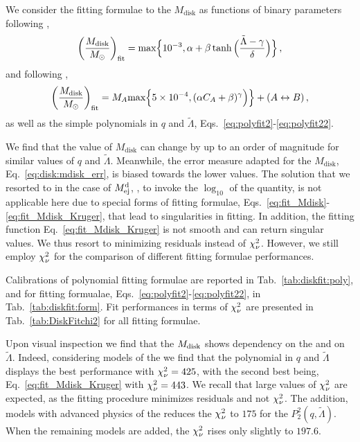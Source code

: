  

We consider the fitting formulae to the $M_{\text{disk}}$ as functions of binary parameters 
following \citet{Radice:2018pdn}, 
%
\begin{equation}
\left(\frac{M_{\rm{disk}}}{M_{\odot}}\right)_{\rm fit} = \text{max}\Big\{10^{-3}, \alpha + \beta \tanh\Big(\frac{\tilde{\Lambda}-\gamma}{\delta}\Big)\Big\}\,,
\label{eq:fit_Mdisk}
\end{equation}
%
and following \citet{Kruger:2020gig}, 
%
\begin{equation}
\left(\frac{M_{\rm{disk}}}{M_{\odot}}\right)_{\rm fit} =
M_A\text{max}\Big\{5\times 10^{-4}, (\alpha C_A + \beta)^\gamma
\Big)\Big\}
+ (A\leftrightarrow B)\, ,
\label{eq:fit_Mdisk_Kruger}
\end{equation}
%
as well as the simple polynomials in $q$ and $\tilde{\Lambda}$, 
Eqs.~\eqref{eq:polyfit2}-\eqref{eq:polyfit22}.


We find that the value of $M_{\text{disk}}$ can change by up to an order of magnitude 
for similar values of $q$ and $\tilde{\Lambda}$. Meanwhile, the error measure adapted for the 
$M_{\text{disk}}$, Eq.~\eqref{eq:disk:mdisk_err}, is biased towards the lower values. 
The solution that we resorted to in the case of $M^{\text{d}}_{\text{ej}}$, \ie, to invoke the $\log_{10}$ of the 
quantity, is not applicable here due to special forms of fitting formulae,  
Eqs.~\eqref{eq:fit_Mdisk}-\eqref{eq:fit_Mdisk_Kruger}, that lead to singularities in fitting.
%
In addition, the fitting function Eq.~\eqref{eq:fit_Mdisk_Kruger} 
is not smooth and can return singular values.
%
We thus resort to minimizing residuals instead of $\chi_{\nu}^2$. However, we still 
employ $\chi_{\nu}^2$ for the comparison of different fitting formulae performances. 

Calibrations of polynomial fitting formulae are reported in 
Tab.~\ref{tab:diskfit:poly}, and for fitting formualae, 
Eqs.~\eqref{eq:polyfit2}-\eqref{eq:polyfit22}, in Tab.~\ref{tab:diskfit:form}.
Fit performances in terms of $\chi_{\nu}^2$ are presented in Tab.~\ref{tab:DiskFitchi2} 
for all fitting formulae. 

Upon visual inspection we find that the $M_{\rm disk}$ shows 
dependency on the \mr{} 
and on $\tilde{\Lambda}$. Indeed, considering models of the \DSrefset{} 
we find 
that the polynomial in $q$ and $\tilde{\Lambda}$ displays the best performance with 
$\chi_{\nu}^2=425$, with the second best being, Eq.~\eqref{eq:fit_Mdisk_Kruger} with $\chi_{\nu}^2=443$.
We recall that large values of $\chi_{\nu}^2$ are expected, as the fitting procedure 
minimizes residuals and not $\chi_{\nu}^2$.
%
The addition, models with advanced physics of the \DSheatcool{} 
reduces the $\chi_{\nu}^2$ to 
$175$ for the $P_2^2(q,\tilde{\Lambda})$. When the remaining models are added,  
the $\chi_{\nu}^2$ rises only slightly to $197.6$.

